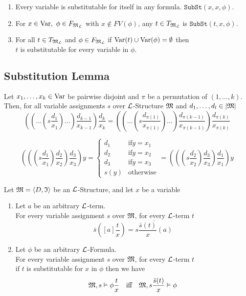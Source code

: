 \documentclass[11pt,a4paper]{article}
\begin{document}
\theoremm{}
\begin{enumerate}
	\item Every variable is substitutable for itself in any formula. $\mathtt{SubSt}(x,x,\phi)$.
	\item For $x\in\mathrm{Var},\ \phi\in F_{\mathfrak{M}_{\mathcal{L}}}$ with $x\not\in FV(\phi)$, any $t\in T_{\mathfrak{M}_{\mathcal{L}}}$ is $\mathtt{SubSt}(t,x,\phi)$.
	\item For all $t\in T_{\mathfrak{M}_{\mathcal{L}}}$ and $\phi\in F_{\mathfrak{M}_{\mathcal{L}}}$ if $\mathrm{Var}(t)\cup\mathrm{Var}(\phi)=\emptyset$ then\\
	$t$ is substitutable for every variable in $\phi$.
\end{enumerate}

\subsection{Substitution Lemma}

\proposition{}
Let $x_1,\dots,x_k\in\mathrm{Var}$ be pairwise disjoint and $\pi$ be a permutation of $(1,\dots,k)$.\\
Then, for all variable assignments $s$ over $\mathcal{L}$-Structure $\mathfrak{M}$ and $d_1,\dots,d_l\in|\mathfrak{M}|$
$$\left(\left(\dots\left(s\frac{d_1}{x_1}\right)\dots\right)\frac{d_{k-1}}{x_{k-1}}\right)\frac{d_k}{x_k}=\left(\left(\dots\left(s\frac{d_{\pi(1)}}{x_{\pi(1)}}\right)\dots\right)\frac{d_{\pi(k-1)}}{x_{\pi(k-1)}}\right)\frac{d_{\pi(k)}}{x_{\pi(k)}}$$

$$\left(\left(\left(s\frac{d_1}{x_1}\right)\frac{d_2}{x_2}\right)\frac{d_3}{x_3}\right)y=\begin{cases}d_1&\text{if}y=x_1\\d_2&\text{if}y=x_2\\d_3&\text{if}y=x_3\\s(y)&\text{otherwise}\end{cases}=\left(\left(\left(s\frac{d_2}{x_2}\right)\frac{d_3}{x_3}\right)\frac{d_1}{x_1}\right)y$$

Let $\mathfrak{M}=\langle D,\mathfrak{I}\rangle$ be an $\mathcal{L}$-Structure, and let $x$ be a variable
\begin{enumerate}
	\item Let $a$ be an arbitrary $\mathcal{L}$-term.\\
	For every variable assignment $s$ over $\mathfrak{M}$, for every $\mathcal{L}$-term  $t$
	$$\bar{s}\left([a]\frac{t}x\right)=\overline{s\frac{\bar{s}(t)}{x}(a)}$$
	\item Let $\phi$ be an arbitrary $\mathcal{L}$-Formula.\\
	For every variable assignment $s$ over $\mathfrak{M}$, for every $\mathcal{L}$-term $t$\\
	if $t$ is substitutable for $x$ in $\phi$ then we have
	$$\mathfrak{M},s\vDash\phi\frac{t}x\quad\text{iff}\quad\mathfrak{M},s\frac{\bar{s}(t)}{x}\vDash\phi$$
\end{enumerate}
\end{document}
